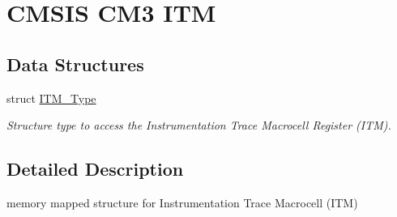 \hypertarget{group___c_m_s_i_s___c_m3___i_t_m}{\section{C\-M\-S\-I\-S C\-M3 I\-T\-M}
\label{group___c_m_s_i_s___c_m3___i_t_m}
}
\subsection*{Data Structures}
\begin{DoxyCompactItemize}
\item 
struct \hyperlink{struct_i_t_m___type}{I\-T\-M\-\_\-\-Type}
\begin{DoxyCompactList}\small\item\em Structure type to access the Instrumentation Trace Macrocell Register (I\-T\-M). \end{DoxyCompactList}\end{DoxyCompactItemize}


\subsection{Detailed Description}
memory mapped structure for Instrumentation Trace Macrocell (I\-T\-M) 